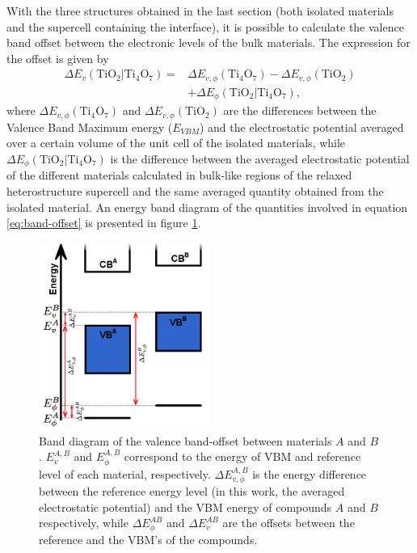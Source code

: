 With the three structures obtained in the last section (both isolated materials and the supercell containing the interface), it is possible to calculate the valence band offset between the electronic levels of the bulk materials. The expression for the offset is given by \cite{Li2009b}
\begin{align}
 \Delta E_v(\text{TiO}_2|\text{Ti}_4\text{O}_7) =& \Delta E_{v,\phi}(\text{Ti}_4\text{O}_7)-\Delta E_{v,\phi}(\text{TiO}_2) \nonumber \\ &+\Delta E_{\phi}(\text{TiO}_2|\text{Ti}_4\text{O}_7),
 \label{eq:band-offset}
\end{align}
where $\Delta E_{v,\phi}(\text{Ti}_4\text{O}_7)$ and $\Delta E_{v,\phi}(\text{TiO}_2)$ are the differences between the Valence Band Maximum energy ($E_{VBM}$) and the electrostatic potential averaged over a certain volume of the unit cell of the isolated materials, while $\Delta E_{\phi}(\text{TiO}_2|\text{Ti}_4\text{O}_7)$ is the difference between the averaged electrostatic potential of the different materials calculated in bulk-like regions of the relaxed heterostructure supercell and the same averaged quantity obtained from the isolated material. An energy band diagram of the quantities involved in equation \ref{eq:band-offset} is presented in figure \ref{fig:bands-diagram}.
\begin{figure}[!ht]
\centering
  \includegraphics[width=0.5\textwidth]{img/band-offset-schematics.jpg}
  \caption{Band diagram of the valence band-offset between materials $A$ and $B$. $E_v^{A,B}$ and $E_{\phi}^{A,B}$ correspond to the energy of VBM and reference level of each material, respectively. $\Delta E_{v,\phi}^{A,B}$ is the energy difference between the reference energy level (in this work, the averaged electrostatic potential) and the VBM energy of compounds $A$ and $B$ respectively, while $\Delta E_{\phi}^{AB}$ and $\Delta E_v^{AB}$ are the offsets between the reference and the VBM's of the compounds.} 
  \label{fig:bands-diagram}
\end{figure}

